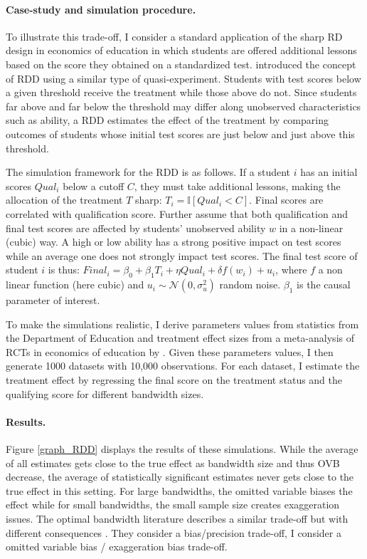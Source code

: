 \documentclass[usletter, 12pt]{article}
\begin{document}
			\paragraph{Case-study and simulation procedure.} To illustrate this trade-off, I consider a standard application of the sharp RD design in economics of education in which students are offered additional lessons based on the score they obtained on a standardized test. \cite{thistlethwaite_regression-discontinuity_1960} introduced the concept of RDD using a similar type of quasi-experiment. Students with test scores below a given threshold receive the treatment while those above do not. Since students far above and far below the threshold may differ along unobserved characteristics such as ability, a RDD estimates the effect of the treatment by comparing outcomes of students whose initial test scores are just below and just above this threshold. 
        
        			 The simulation framework for the RDD is as follows. If a student $i$ has an initial scores $Qual_{i}$ below a cutoff $C$, they must take additional lessons, making the allocation of the treatment $T$ sharp: $T_i = \mathbb{I}[Qual_{i} < C]$. Final scores are correlated with qualification score. Further assume that both qualification and final test scores are affected by students' unobserved ability $w$ in a non-linear (cubic) way. A high or low ability has a strong positive impact on test scores while an average one does not strongly impact test scores. The final test score of student $i$ is thus: $Final_{i} = \beta_{0} + \beta_{1} T_i + \eta Qual_{i} +  \delta f(w_i) + u_{i}$, where $f$ a non linear function (here cubic) and $u_{i} \sim \mathcal{N}(0, \sigma_{u}^{2})$ random noise. $\beta_{1}$ is the causal parameter of interest. 
        
        			To make the simulations realistic, I derive parameters values from statistics from the Department of Education and treatment effect sizes from a meta-analysis of RCTs in economics of education by \cite{kraft_interpreting_2020}.  Given these parameters values, I then generate 1000 datasets with 10,000 observations. For each dataset, I estimate the treatment effect by regressing the final score on the treatment status and the qualifying score for different bandwidth sizes. 
				
			\paragraph{Results.}  Figure \ref{graph_RDD} displays the results of these simulations. While the average of all estimates gets close to the true effect as bandwidth size and thus OVB decrease, the average of statistically significant estimates never gets close to the true effect in this setting. For large bandwidths, the omitted variable biases the effect while for small bandwidths, the small sample size creates exaggeration issues. The optimal bandwidth literature describes a similar trade-off but with different consequences \citep{imbens_optimal_2012}. They consider a bias/precision trade-off, I consider a omitted variable bias / exaggeration bias trade-off. 
        
\end{document}
